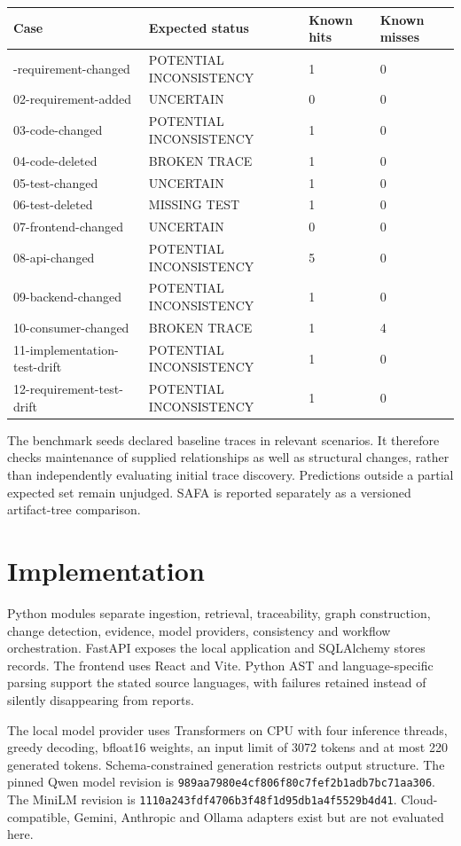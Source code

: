 \documentclass[
  11pt,
  a4paper,
]{report}
\begin{document}
\begin{longtable}[]{@{}llll@{}}
\toprule\noalign{}
Case & Expected status & Known hits & Known misses \\
\midrule\noalign{}
\endhead
\bottomrule\noalign{}
\endlastfoot
01-requirement-changed & POTENTIAL INCONSISTENCY & 1 & 0 \\
02-requirement-added & UNCERTAIN & 0 & 0 \\
03-code-changed & POTENTIAL INCONSISTENCY & 1 & 0 \\
04-code-deleted & BROKEN TRACE & 1 & 0 \\
05-test-changed & UNCERTAIN & 1 & 0 \\
06-test-deleted & MISSING TEST & 1 & 0 \\
07-frontend-changed & UNCERTAIN & 0 & 0 \\
08-api-changed & POTENTIAL INCONSISTENCY & 5 & 0 \\
09-backend-changed & POTENTIAL INCONSISTENCY & 1 & 0 \\
10-consumer-changed & BROKEN TRACE & 1 & 4 \\
11-implementation-test-drift & POTENTIAL INCONSISTENCY & 1 & 0 \\
12-requirement-test-drift & POTENTIAL INCONSISTENCY & 1 & 0 \\
\end{longtable}

The benchmark seeds declared baseline traces in relevant scenarios. It
therefore checks maintenance of supplied relationships as well as
structural changes, rather than independently evaluating initial trace
discovery. Predictions outside a partial expected set remain unjudged.
SAFA is reported separately as a versioned artifact-tree comparison.

\hypertarget{implementation}{%
\chapter{Implementation}\label{implementation}}

Python modules separate ingestion, retrieval, traceability, graph
construction, change detection, evidence, model providers, consistency
and workflow orchestration. FastAPI exposes the local application and
SQLAlchemy stores records. The frontend uses React and Vite. Python AST
and language-specific parsing support the stated source languages, with
failures retained instead of silently disappearing from reports.

The local model provider uses Transformers on CPU with four inference
threads, greedy decoding, bfloat16 weights, an input limit of 3072
tokens and at most 220 generated tokens. Schema-constrained generation
restricts output structure. The pinned Qwen model revision is
\texttt{989aa7980e4cf806f80c7fef2b1adb7bc71aa306}. The MiniLM revision
is \texttt{1110a243fdf4706b3f48f1d95db1a4f5529b4d41}. Cloud-compatible,
Gemini, Anthropic and Ollama adapters exist but are not evaluated here.
\end{document}
